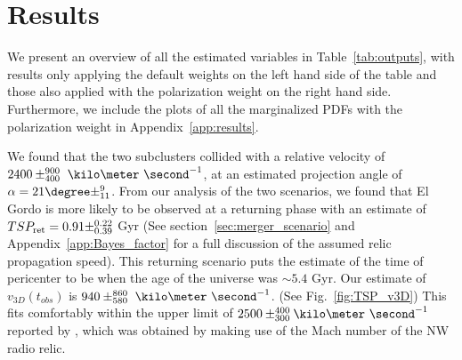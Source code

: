 \documentclass[ucdthesis.tex]{subfiles}
\begin{document}
    \section{Results} 
    We present an
    overview of all the estimated variables in Table~\ref{tab:outputs}, with
    results only applying the default weights on the left hand side of the table
    and those also applied with the polarization weight on the right hand side.
    Furthermore, we include the plots of all the marginalized PDFs with the
    polarization weight in Appendix~\ref{app:results}. \par
    We found that the two subclusters collided with a relative velocity of $2400\pm^{900}_{400}~\kilo\meter~\second^{-1}$, at an estimated projection
    angle of $\alpha = 21\degree\pm^{9}_{11}$. From our analysis of the two
    scenarios, we found that El Gordo is more likely to be observed at a returning
    phase with an estimate of $TSP_{\rm ret} = 0.91\pm^{0.22}_{0.39}$ Gyr
    (See section~\ref{sec:merger_scenario} and Appendix~\ref{app:Bayes_factor}
    for a full discussion of the assumed relic propagation speed). This
    returning scenario puts the
    estimate of the time of pericenter to be when the age of the universe was
    $\sim5.4$ Gyr. 
    Our estimate of $v_{3D}(t_{obs})$ is
    $940\pm^{860}_{580}~\kilo\meter~\second^{-1}$. (See Fig.~\ref{fig:TSP_v3D})
    This fits comfortably within the upper limit of $2500
    \pm^{400}_{300}\kilo\meter~\second^{-1}$ reported by \cite{L13},
    which was obtained by making use of the Mach number of the NW radio relic.
    
\end{document}
